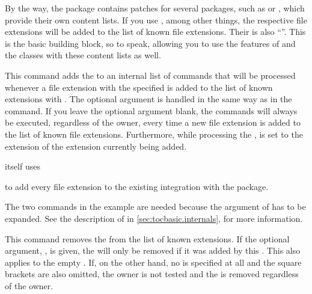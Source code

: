By the way, the \hyperref[cha:scrhack]{}%
package contains patches for several packages, such as
 or
, which provide their own content
lists. If you use \hyperref[cha:scrhack]{}, among other
things, the respective file extensions will be added to the list of known file
extensions. Their  is also ``''. This is the basic
building block, so to speak, allowing you to use the features of
 and the \KOMAScript{} classes with these content lists as
well.%
\EndIndexGroup


\begin{Declaration}
\end{Declaration}
This command adds the  to an internal list of commands that
will be processed whenever a file extension with the specified 
is added to the list of known extensions with
. The optional argument is handled in the
same way as in the  command. If you leave
the optional argument blank, the commands will always be executed, regardless
of the owner, every time a new file extension is added to the list of known
file extensions. Furthermore, while processing the ,
 is set to the
extension of the extension currently being added.
\begin{Example}
   itself uses
\begin{lstcode}
  \AtAddToTocList[]{%
    \expandafter\tocbasic@extend@babel
    \expandafter{\@currext}%
  }
\end{lstcode}
  to add every file extension to the existing  integration 
  with the  package.
\end{Example}

The two  commands in the example are needed because the
argument of  has to be expanded.
See the description of  in
\autoref{sec:tocbasic.internals},
 for more information.%
\EndIndexGroup


\begin{Declaration}
\end{Declaration}
This command removes the  from the list of known extensions.
If the optional argument, , is given, the 
will only be removed if it was added by this .
This also applies to the empty .  If, on the other hand, no
 is specified at all and the square brackets are also
omitted, the owner is not tested and the  is removed
regardless of the owner.%
\EndIndexGroup



